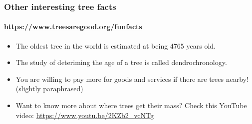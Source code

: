 \begin{frame}
	\frametitle{Other interesting tree facts}
	\framesubtitle{\url{https://www.treesaregood.org/funfacts}}
	
	\begin{itemize}
		\item The oldest tree in the world is estimated at being 4765 years old.
			\pause
		\item The study of deteriming the age of a tree is called dendrochronology.
			\pause
		\item You are willing to pay more for goods and services if there are trees nearby! (slightly paraphrased)
			\pause
		\item Want to know more about where trees get their mass? Check this YouTube video:
			\url{https://www.youtu.be/2KZb2_vcNTg}
	\end{itemize}
\end{frame}

